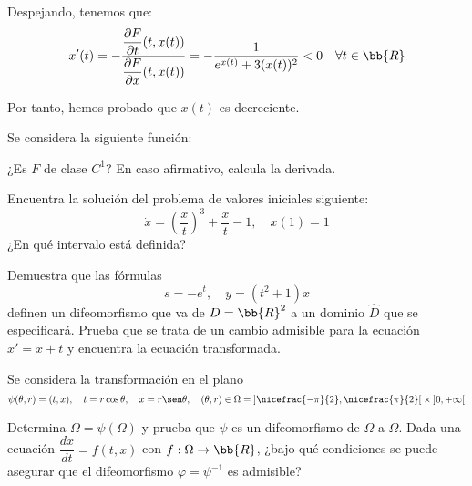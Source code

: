 \documentclass[12pt]{article}
\begin{document}
\begin{ejercicio}
\begin{description}
            Despejando, tenemos que:
            \begin{equation*}
                x'(t) = -\dfrac{\dfrac{\partial F}{\partial t}(t, x(t))}{\dfrac{\partial F}{\partial x}(t, x(t))} = -\dfrac{1}{e^{x(t)} + 3(x(t))^2} < 0 \quad \forall t\in\bb{R}
            \end{equation*}

            Por tanto, hemos probado que $x(t)$ es decreciente.
        \end{description}
    \end{ejercicio}


\begin{ejercicio}
    Se considera la siguiente función:
    \Func{F}{]0, +\infty[}{\bb{R}}{t}{\int_0^{\sqrt{t}} e^{s^2} ~ds}

    ¿Es $F$ de clase $C^1$? En caso afirmativo, calcula la derivada.
\end{ejercicio}


\begin{ejercicio}
    Encuentra la solución del problema de valores iniciales siguiente:
    \begin{equation*}
        \dot{x} = \left(\dfrac{x}{t}\right)^3 + \dfrac{x}{t} - 1, \quad x(1) = 1
    \end{equation*}
    ¿En qué intervalo está definida?
\end{ejercicio}


\begin{ejercicio}
    Demuestra que las fórmulas
    \begin{equation*}
        s = -e^t, \quad y = (t^2 + 1)x
    \end{equation*}
    definen un difeomorfismo que va de $D = \bb{R}^2$ a un dominio $\hat{D}$ que se especificará.
    Prueba que se trata de un cambio admisible para la ecuación $x' = x + t$ y encuentra la ecuación transformada.
\end{ejercicio}

\begin{ejercicio}
    Se considera la transformación en el plano
    \begin{equation*}
        \psi(\theta, r) = (t, x), \quad t = r\cos \theta, \quad x = r\sen \theta, \quad (\theta, r) \in \Omega = \left]\nicefrac{-\pi}{2}, \nicefrac{\pi}{2}\right[ \times \left]0, +\infty\right[
    \end{equation*}

    Determina $\Omega = \psi(\Omega)$ y prueba que $\psi$ es un difeomorfismo de $\Omega$ a $\Omega$. Dada una ecuación $\dfrac{dx}{dt} = f(t, x)$ con $f : \Omega \to \bb{R}$, ¿bajo qué condiciones se puede asegurar que el difeomorfismo $\varphi = \psi^{-1}$ es admisible?
\end{ejercicio}

    
\end{document}
